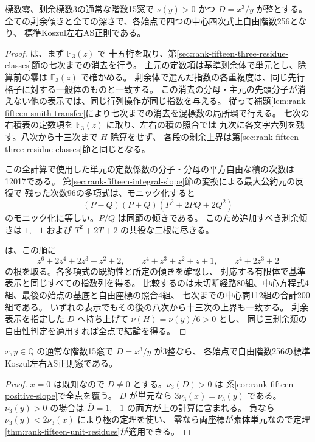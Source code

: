 \begin{theorem}\label{thm:rank-fifteen-integral-depth}
標数零、剰余標数3の通常な階数15窓で $\nu(y)>0$ かつ $D=x^3/y$ が整とする。
全ての剰余傾きと全ての深さで、各始点で四つの中心四次式上自由階数256となり、
標準Koszul左右AS正則である。
\end{theorem}
\begin{proof}
 は、まず $\mathbb F_3(z)$ で
十五桁を取り、第\ref{sec:rank-fifteen-three-residue-classes}節の七次までの消去を行う。
主元の定数項は基準剰余体で単元とし、除算前の零は $\mathbb F_3(z)$ で確かめる。
剰余体で選んだ指数の各重複度は、同じ先行格子に対する一般体のものと一致する。
この消去の分母・主元の先頭分子が消えない他の表示では、同じ行列操作が同じ指数を与える。
従って補題\ref{lem:rank-fifteen-smith-transfer}により七次までの消去を混標数の局所環で行える。
七次の右積表の定数項を $\mathbb F_3(z)$ に取り、左右の積の照合では
九次に各文字六列を残す。八次から十三次まで $H$ 除算をせず、
各段の剰余上界は第\ref{sec:rank-fifteen-three-residue-classes}節と同じとなる。

この全計算で使用した単元の定数係数の分子・分母の平方自由な積の次数は12017である。
第\ref{sec:rank-fifteen-integral-slope}節の変換による最大公約元の反復で
残った次数96の多項式は、モニック化すると
\[
               (P-Q)(P+Q)(P^2+2PQ+2Q^2)
\]
のモニック化に等しい。$P/Q$ は同節の傾きである。
このため追加すべき剰余傾きは $1,-1$ および $T^2+2T+2$ の共役な二根に尽きる。

 は、この順に
\[
 z^6+2z^4+2z^3+z^2+2,\qquad z^4+z^3+z^2+z+1,\qquad z^4+2z^3+2
\]
の根を取る。各多項式の既約性と所定の傾きを確認し、
対応する有限体で基準表示と同じすべての指数列を得る。
比較するのは未切断経路80組、中心方程式4組、最後の始点の基底と自由座標の照合4組、
七次までの中心商112組の合計200組である。
いずれの表示でもその後の八次から十三次の上界も一致する。
剰余表示を指定した $D$ へ持ち上げて $\nu(H)=\nu(y)/6>0$ とし、
同じ三剰余類の自由性判定を適用すれば全点で結論を得る。
\end{proof}
\begin{corollary}\label{cor:rank-fifteen-rational-integral-slopes}
$x,y\in\mathbb Q$ の通常な階数15窓で $D=x^3/y$ が3整なら、
各始点で自由階数256の標準Koszul左右AS正則窓である。
\end{corollary}
\begin{proof}
$x=0$ は既知なので $D\ne0$ とする。$\nu_3(D)>0$ は
系\ref{cor:rank-fifteen-positive-slope}で全点を覆う。
$D$ が単元なら $3\nu_3(x)=\nu_3(y)$ である。
$\nu_3(y)>0$ の場合は $\bar D=1,-1$ の両方が上の計算に含まれる。
負なら $\nu_3(y)<2\nu_3(x)$ により極の定理を使い、
零なら両座標が素体単元なので定理\ref{thm:rank-fifteen-unit-residues}が適用できる。
\end{proof}

